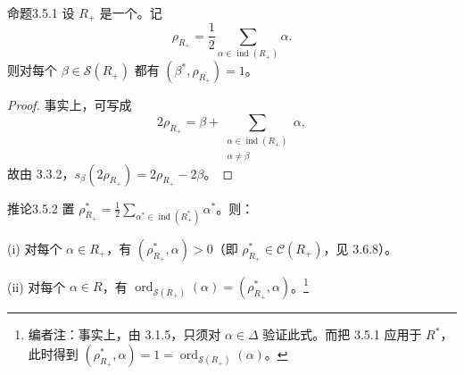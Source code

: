 \begin{SGAresult}{命题}{3.5.1}
设 $R_+$ 是一个。记
\[\rho_{R_+}=\frac12\sum_{\alpha\in\operatorname{ind}(R_+)}\alpha.\]
则对每个 $\beta\in\mathscr S(R_+)$ 都有 $(\beta^*,\rho_{R_+})=1$。
\end{SGAresult}
\begin{proof}
事实上，可写成
\[2\rho_{R_+}=\beta+\sum_{\substack{\alpha\in\operatorname{ind}(R_+)\\\alpha\ne\beta}}\alpha,\]
故由 3.3.2，$s_\beta(2\rho_{R_+})=2\rho_{R_+}-2\beta$。
\end{proof}
\begin{SGAresult}{推论}{3.5.2}
置 $\rho^*_{R_+}=\frac12\sum_{\alpha^*\in\operatorname{ind}(R_+^*)}\alpha^*$。则：

(i) 对每个 $\alpha\in R_+$，有 $(\rho^*_{R_+},\alpha)>0$（即 $\rho^*_{R_+}\in\mathscr C(R_+)$，见 3.6.8）。

(ii) 对每个 $\alpha\in R$，有 $\operatorname{ord}_{\mathscr S(R_+)}(\alpha)=(\rho^*_{R_+},\alpha)$。\footnote{编者注：事实上，由 3.1.5，只须对 $\alpha\in\Delta$ 验证此式。而把 3.5.1 应用于 $R^*$，此时得到 $(\rho^*_{R_+},\alpha)=1=\operatorname{ord}_{\mathscr S(R_+)}(\alpha)$。}
\end{SGAresult}

